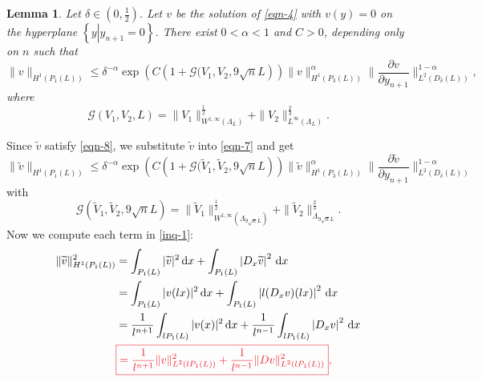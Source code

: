 \documentclass[12pt]{amsart}
\renewcommand{\d}{\,\mathrm{d}}
\newtheorem{lemma}[theorem]{Lemma}
\theoremstyle{definition}
\begin{document}
\begin{lemma}\label{lma-1}
	Let  $\delta \in (0,\frac{1}{2})$. Let $v$ be the solution of \eqref{eqn-4} with $v(y)=0$ on the hyperplane $\left\{y\left| y_{n+1}=0\right.\right\} $. There exist $0<\alpha <1$ and $C>0$, depending only on $n$ such that
	\begin{equation}\label{eqn-7}
		\|v\|_{H^{1}\left( P_1(L) \right) }\le \delta^{-\alpha }\exp \left( C\left( 1+\mathcal{G}(V_1,V_2,9\sqrt{n} L \right)  \right) \|v\|^{\alpha }_{H^{1}\left( P_3(L) \right) }\|\frac{\partial v}{\partial y_{n+1}}\|^{1-\alpha }_{L^2\left( D_\delta(L) \right) }, 
	\end{equation}
	where 
	\begin{equation}\label{eqn-8}
		\mathcal{G}\left( V_1,V_2,L \right) =\|V_1\|^{\frac{1}{2}}_{W^{1,\infty}(\Lambda_L)}+\|V_2\|^{\frac{2}{3}}_{L^{\infty}(\Lambda_L)}.
	\end{equation}
\end{lemma}
Since $\widetilde{v}$ satisfy \eqref{eqn-8}, we substitute $\widetilde{v}$ into \eqref{eqn-7} and get
\begin{equation}\label{inq-1}	
	\|\widetilde{v}\|_{H^{1}\left( P_1(L) \right) }\le \delta^{-\alpha }\exp \left( C\left( 1+\mathcal{G}(\widetilde{V}_1,\widetilde{V}_2,9\sqrt{n} L \right)  \right) \|\widetilde{v}\|^{\alpha }_{H^{1}\left( P_3(L) \right) }\|\frac{\partial \widetilde{v}}{\partial y_{n+1}}\|^{1-\alpha }_{L^2\left( D_\delta(L) \right) } 
\end{equation}
with
\begin{equation}\label{eqn-10}
	\mathcal{G}(\widetilde{V}_1,\widetilde{V}_2,9\sqrt{n} L)=\|\widetilde{V}_1\|^{\frac{1}{2}}_{W^{1,\infty}(\Lambda_{9\sqrt{n} L})}+ \|\widetilde{V}_2\|^{\frac{2}{3}}_{\Lambda_{9\sqrt{n} L}}.
\end{equation}
Now we compute each term in \eqref{inq-1}:
\begin{equation}\label{term-1}
	\begin{aligned}
		\|\widetilde{v}\|_{H^{1}(P_1(L))}^2&= \int_{P_1(L)}|\widetilde{v}|^2\d x+ \int_{P_1(L)} \left| D_x \widetilde{v} \right| ^2\d x \\
						   &= \int_{P_1(L)}|v(lx)|^2\d x+ \int_{P_1(L)}\left| l (D_{x} v)(lx) \right|^2\d x\\
						   &= \frac{1}{l^{n+1}}\int_{lP_1(L)}|v(x)|^2\d x+ \frac{1}{l^{n-1}}\int_{lP_1(L)} \left| D_x v \right| ^2\d x\\
						   &\textcolor{Red}{\boxed{= \frac{1}{l^{n+1}}\|v\|^2_{L^2\left( lP_1(L) \right) }+\frac{1}{l^{n-1}}\|Dv\|^2_{L^2\left( lP_1(L) \right) }},} 
	\end{aligned} 
\end{equation}
\end{document}
